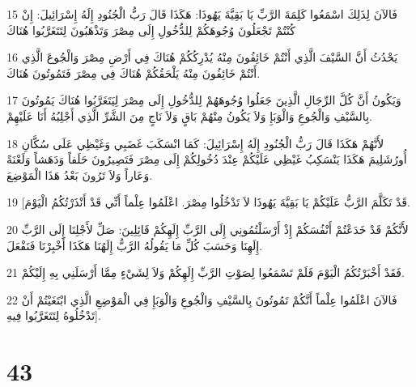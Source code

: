 \par 15 فَالآنَ لِذَلِكَ اسْمَعُوا كَلِمَةَ الرَّبِّ يَا بَقِيَّةَ يَهُوذَا: هَكَذَا قَالَ رَبُّ الْجُنُودِ إِلَهُ إِسْرَائِيلَ: إِنْ كُنْتُمْ تَجْعَلُونَ وُجُوهَكُمْ لِلدُّخُولِ إِلَى مِصْرَ وَتَذْهَبُونَ لِتَتَغَرَّبُوا هُنَاكَ
\par 16 يَحْدُثُ أَنَّ السَّيْفَ الَّذِي أَنْتُمْ خَائِفُونَ مِنْهُ يُدْرِكُكُمْ هُنَاكَ فِي أَرْضِ مِصْرَ وَالْجُوعَ الَّذِي أَنْتُمْ خَائِفُونَ مِنْهُ يَلْحَقُكُمْ هُنَاكَ فِي مِصْرَ فَتَمُوتُونَ هُنَاكَ.
\par 17 وَيَكُونُ أَنَّ كُلَّ الرِّجَالِ الَّذِينَ جَعَلُوا وُجُوهَهُمْ لِلدُّخُولِ إِلَى مِصْرَ لِيَتَغَرَّبُوا هُنَاكَ يَمُوتُونَ بِالسَّيْفِ وَالْجُوعِ وَالْوَبَإِ وَلاَ يَكُونُ مِنْهُمْ بَاقٍ وَلاَ نَاجٍ مِنَ الشَّرِّ الَّذِي أَجْلِبُهُ أَنَا عَلَيْهِمْ.
\par 18 لأَنَّهُمْ هَكَذَا قَالَ رَبُّ الْجُنُودِ إِلَهُ إِسْرَائِيلَ: كَمَا انْسَكَبَ غَضَبِي وَغَيْظِي عَلَى سُكَّانِ أُورُشَلِيمَ هَكَذَا يَنْسَكِبُ غَيْظِي عَلَيْكُمْ عِنْدَ دُخُولِكُمْ إِلَى مِصْرَ فَتَصِيرُونَ حَلَفاً وَدَهَشاً وَلَعْنَةً وَعَاراً وَلاَ تَرُونَ بَعْدُ هَذَا الْمَوْضِعَ.
\par 19 [قَدْ تَكَلَّمَ الرَّبُّ عَلَيْكُمْ يَا بَقِيَّةَ يَهُوذَا لاَ تَدْخُلُوا مِصْرَ. اعْلَمُوا عِلْماً أَنِّي قَدْ أَنْذَرْتُكُمُ الْيَوْمَ.
\par 20 لأَنَّكُمْ قَدْ خَدَعْتُمْ أَنْفُسَكُمْ إِذْ أَرْسَلْتُمُونِي إِلَى الرَّبِّ إِلَهِكُمْ قَائِلِينَ: صَلِّ لأَجْلِنَا إِلَى الرَّبِّ إِلَهِنَا وَحَسَبَ كُلِّ مَا يَقُولُهُ الرَّبُّ إِلَهُنَا هَكَذَا أَخْبِرْنَا فَنَفْعَلَ.
\par 21 فَقَدْ أَخْبَرْتُكُمُ الْيَوْمَ فَلَمْ تَسْمَعُوا لِصَوْتِ الرَّبِّ إِلَهِكُمْ وَلاَ لِشَيْءٍ مِمَّا أَرْسَلَنِي بِهِ إِلَيْكُمْ.
\par 22 فَالآنَ اعْلَمُوا عِلْماً أَنَّكُمْ تَمُوتُونَ بِالسَّيْفِ وَالْجُوعِ وَالْوَبَإِ فِي الْمَوْضِعِ الَّذِي ابْتَغَيْتُمْ أَنْ تَدْخُلُوهُ لِتَتَغَرَّبُوا فِيهِ].

\chapter{43}

